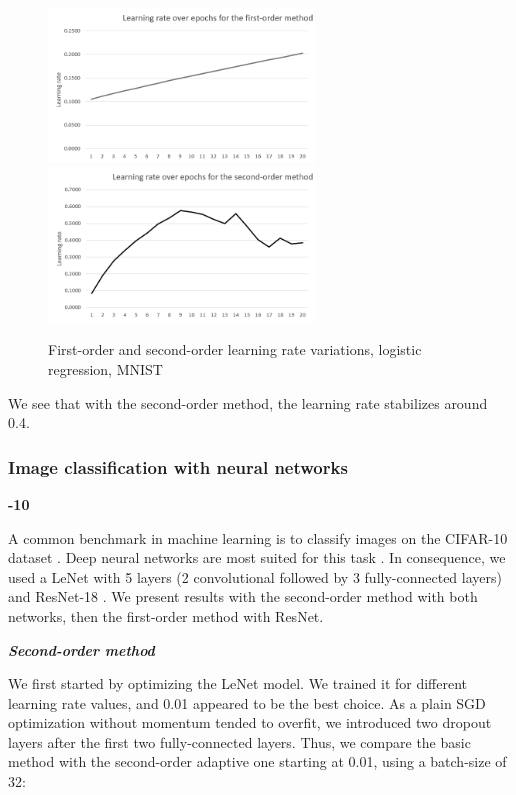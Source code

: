 \documentclass{article}
\begin{document}
  \begin{figure}[!h]
	\includegraphics[width=200pt]{lr_logistic_1st_order.png}
	\includegraphics[width=200pt]{lr_logistic_2nd_order.png}
	\caption{First-order and second-order learning rate variations, logistic regression, MNIST}
  \end{figure} 

  We see that with the second-order method, the learning rate stabilizes around 0.4. 

  \newpage
  \subsubsection{Image classification with neural networks}
  
  \textbf{-10}
  
  A common benchmark in machine learning is to classify images on the CIFAR-10 dataset \cite{cifar}. Deep neural networks are most suited for this task \cite{krizhevsky2012imagenet}. In consequence, we used a LeNet with 5 layers (2 convolutional followed by 3 fully-connected layers) and ResNet-18 \cite{he2016deep}. We present results with the second-order method with both networks, then the first-order method with ResNet.
  
  \emph{\textbf{Second-order method}}
  
  We first started by optimizing the LeNet model. We trained it for different learning rate values, and 0.01 appeared to be the best choice. As a plain SGD optimization without momentum tended to overfit, we introduced two dropout layers after the first two fully-connected layers. Thus, we compare the basic method with the second-order adaptive one starting at 0.01, using a batch-size of 32:\\
  
\end{document}
